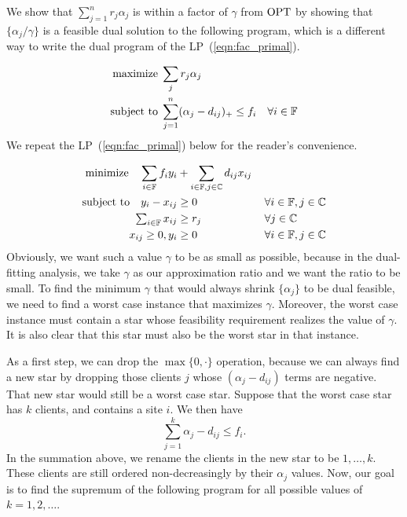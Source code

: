 \documentclass[oneside,final]{ucr}
\def\dsp{\def\baselinestretch{2.0}\large\normalsize}
\def\ssp{\def\baselinestretch{1.0}\large\normalsize}
\begin{document}
We show that $\sum_{j=1}^n r_j \alpha_j$ is within a factor
of $\gamma$ from $\mbox{\rm OPT}$ by showing that
$\{\alpha_j/\gamma\}$ is a feasible dual solution to the
following program, which is a different way to write the
dual program of the LP~(\ref{eqn:fac_primal}).

\ssp
\begin{align}
  \label{eqn:dual_fitting}
  \textrm{maximize}\; &\sum_j r_j\alpha_j\\ \notag
  \textrm{subject to}\; & \sum_{j=1}^n (\alpha_j - d_{ij})_+
  \leq f_i \quad \forall i \in \mathbb{F}
\end{align}
\dsp
We repeat the LP~(\ref{eqn:fac_primal}) below for the reader's
convenience.

\ssp
\begin{align*}
  \textrm{minimize} \quad \sum_{i\in
      \mathbb{F}} f_iy_i &+ \sum_{i\in \mathbb{F}, j\in
      \mathbb{C}}d_{ij}x_{ij} & &
  \\ \notag
  \textrm{subject to}\quad y_i - x_{ij} &\geq 0 &\, &\forall i\in \mathbb{F}, j\in \mathbb{C} 
  \\ \notag
  \textstyle{\sum_{i\in \mathbb{F}} x_{ij}} &\geq r_j &\, &\forall j\in \mathbb{C}
  \\ \notag
  x_{ij} \geq 0, y_i  &\geq 0 &\, &\forall i\in \mathbb{F}, j\in \mathbb{C}
\end{align*}
\dsp
Obviously, we want such a value $\gamma$ to be as small as
possible, because in the dual-fitting analysis, we take
$\gamma$ as our approximation ratio and we want the ratio to
be small. To find the minimum $\gamma$ that would always
shrink $\{\alpha_j\}$ to be dual feasible, we need to find a
worst case instance that maximizes $\gamma$. Moreover, the
worst case instance must contain a star whose feasibility
requirement realizes the value of $\gamma$. It is also clear
that this star must also be the worst star in that instance.

As a first step, we can drop the $\max\{0, \cdot\}$
operation, because we can always find a new star by dropping
those clients $j$ whose $(\alpha_j - d_{ij})$ terms are
negative. That new star would still be a worst case
star. Suppose that the worst case star has $k$ clients, and
contains a site $i$. We then have
\begin{equation*}
  \sum_{j=1}^k \alpha_j - d_{ij} \leq f_i.
\end{equation*}
In the summation above, we rename the clients in the new
star to be $1,\ldots,k$. These clients are still ordered
non-decreasingly by their $\alpha_j$ values. Now, our goal
is to find the supremum of the following program for all
possible values of $k=1,2,\ldots$.
\end{document}
